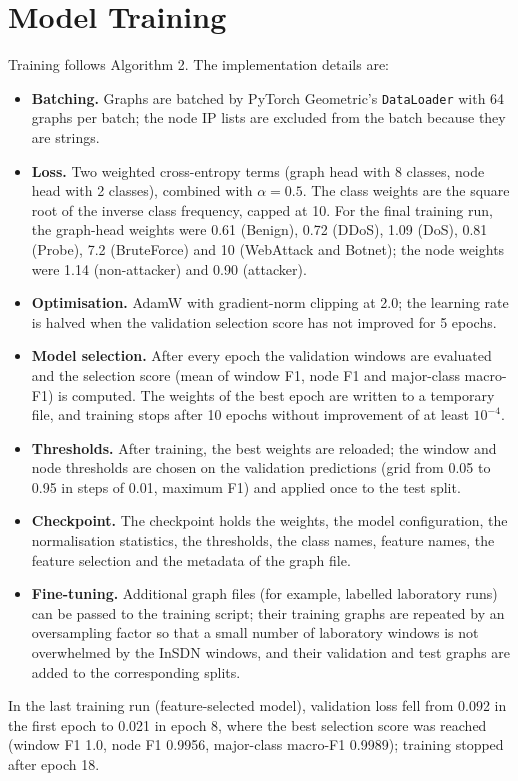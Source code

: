 \section{Model Training}
Training follows Algorithm 2. The implementation details are:
\begin{itemize}
	\item \textbf{Batching.} Graphs are batched by PyTorch Geometric's \texttt{DataLoader} with 64 graphs per batch; the node IP lists are excluded from the batch because they are strings.
	\item \textbf{Loss.} Two weighted cross-entropy terms (graph head with 8 classes, node head with 2 classes), combined with $\alpha=0.5$. The class weights are the square root of the inverse class frequency, capped at 10. For the final training run, the graph-head weights were 0.61 (Benign), 0.72 (DDoS), 1.09 (DoS), 0.81 (Probe), 7.2 (BruteForce) and 10 (WebAttack and Botnet); the node weights were 1.14 (non-attacker) and 0.90 (attacker).
	\item \textbf{Optimisation.} AdamW \cite{bib:adam} with gradient-norm clipping at 2.0; the learning rate is halved when the validation selection score has not improved for 5 epochs.
	\item \textbf{Model selection.} After every epoch the validation windows are evaluated and the selection score (mean of window F1, node F1 and major-class macro-F1) is computed. The weights of the best epoch are written to a temporary file, and training stops after 10 epochs without improvement of at least $10^{-4}$.
	\item \textbf{Thresholds.} After training, the best weights are reloaded; the window and node thresholds are chosen on the validation predictions (grid from 0.05 to 0.95 in steps of 0.01, maximum F1) and applied once to the test split.
	\item \textbf{Checkpoint.} The checkpoint holds the weights, the model configuration, the normalisation statistics, the thresholds, the class names, feature names, the feature selection and the metadata of the graph file.
	\item \textbf{Fine-tuning.} Additional graph files (for example, labelled laboratory runs) can be passed to the training script; their training graphs are repeated by an oversampling factor so that a small number of laboratory windows is not overwhelmed by the InSDN windows, and their validation and test graphs are added to the corresponding splits.
\end{itemize}
In the last training run (feature-selected model), validation loss fell from 0.092 in the first epoch to 0.021 in epoch 8, where the best selection score was reached (window F1 1.0, node F1 0.9956, major-class macro-F1 0.9989); training stopped after epoch 18.

